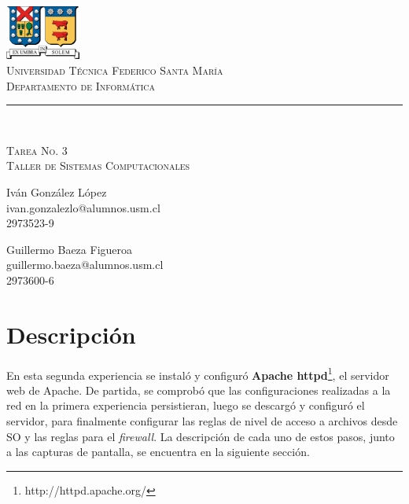 \documentclass[11pt]{article}
\makeatletter
\newcommand{\labno}{3}
\newcommand{\labtitle}{Taller de Sistemas Computacionales}
\newcommand{\nameone}{Iván González López}
\newcommand{\emailone}{ivan.gonzalezlo@alumnos.usm.cl}
\newcommand{\rolone}{2973523-9}
\newcommand{\nametwo}{Guillermo Baeza Figueroa}
\newcommand{\emailtwo}{guillermo.baeza@alumnos.usm.cl}
\newcommand{\roltwo}{2973600-6}
\makeatother
\begin{document}
\begin{titlepage}
\begin{center}


\includegraphics[width=70pt]{logos/utfsm.pdf} \\
{\Large \textsc{Universidad Técnica Federico Santa María} \\}
{\Large \textsc{Departamento de Informática} \\ \vspace{4pt}}
{\rule[13pt]{\textwidth}{1pt} \\ \vspace{25pt}}
{\LARGE \textsc{Tarea No. \labno} \\}
{\LARGE \textsc{\labtitle} \\ \vspace{50pt}}

\begin{minipage}{0.4\textwidth}
\begin{flushleft}
{\large \nameone} \\
\emailone \\
\rolone
\end{flushleft}
\end{minipage}
\hfill
\begin{minipage}{0.4\textwidth}
\begin{flushright}
{\large \nametwo} \\
\emailtwo \\
\roltwo
\end{flushright}
\end{minipage}
\end{center}
\end{titlepage}

\section{Descripción}
En esta segunda experiencia se instaló y configuró \textbf{Apache httpd}\footnote{http://httpd.apache.org/}, el servidor web de Apache. De partida, se comprobó que las configuraciones realizadas a la red en la primera experiencia persistieran, luego se descargó y configuró el servidor, para finalmente configurar las reglas de nivel de acceso a archivos desde SO y las reglas para el \textit{firewall}. La descripción de cada uno de estos pasos, junto a las capturas de pantalla, se encuentra en la siguiente sección.
\end{document}
